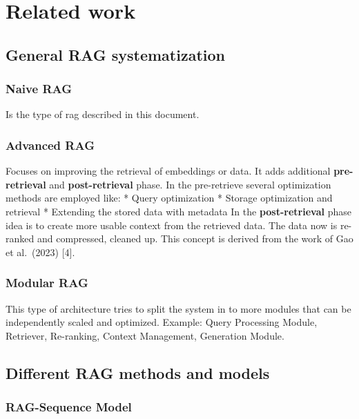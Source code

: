 \documentclass[11pt]{wseas}
\begin{document}
    \newpage

\section{Related work}\label{related-work}

\subsection{General RAG
systematization}\label{general-rag-systematization}

\subsubsection{Naive RAG}\label{naive-rag}

Is the type of rag described in this document.

\subsubsection{Advanced RAG}\label{advanced-rag}

Focuses on improving the retrieval of embeddings or data. It adds
additional \textbf{pre-retrieval} and \textbf{post-retrieval} phase. In
the pre-retrieve several optimization methods are employed like: * Query
optimization * Storage optimization and retrieval * Extending the stored
data with metadata In the \textbf{post-retrieval} phase idea is to
create more usable context from the retrieved data. The data now is
re-ranked and compressed, cleaned up. This concept is derived from the
work of Gao et al.~(2023) {[}4{]}.

\subsubsection{Modular RAG}\label{modular-rag}

This type of architecture tries to split the system in to more modules
that can be independently scaled and optimized. Example: Query
Processing Module, Retriever, Re-ranking, Context Management, Generation
Module.

\subsection{Different RAG methods and
models}\label{different-rag-methods-and-models}

\subsubsection{RAG-Sequence Model}\label{rag-sequence-model}
\end{document}

